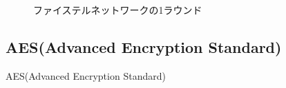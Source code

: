 \documentclass[dvipdfmx]{beamer}
\begin{document}
\begin{frame}
    \begin{figure}[t]
        \centering
        \caption{ファイステルネットワークの1ラウンド}
        \label{fig:ファイステルネットワークの1ラウンド}
        \begin{tikzpicture}

        \end{tikzpicture}
    \end{figure}
\end{frame}



\subsection{AES(Advanced Encryption Standard)}
\begin{frame}{AES(Advanced Encryption Standard)}
    
\end{frame}
\end{document}

